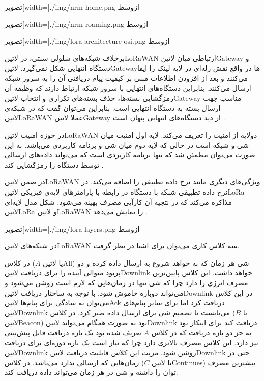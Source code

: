 ‌تصویر[width=\textwidth]{./img/nrm-home.png}
‌ازوسط

‌تصویر[width=\textwidth]{./img/nrm-roaming.png}
‌ازوسط

‌تصویر[width=\textwidth]{./img/lora-architecture-osi.png}
‌ازوسط

برخلاف شبکه‌های سلولی سنتی، در ‌لاتین{LoRaWAN} ارتباطی میان ‌لاتین{Gateway} و دستگاه انتهایی شکل نمی‌گیرد.
‌لاتین{Gateway}ها در واقع نقش رله‌ای در لایه لینک را ایفا می‌کنند و بعد از افزودن اطلاعات مبنی بر کیفیت پیام دریافتی آن
را به سرور شبکه ارسال می‌کنند. بنابراین دستگاه‌های انتهایی با سرور شبکه ارتباط دارند که وظیفه آن رمزگشایی بسته‌ها، حذف بسته‌های تکراری و
انتخاب ‌لاتین{Gateway} مناسب جهت ارسال بسته به دستگاه انتهایی است.
بنابراین می‌توان گفت که در شبکه‌ی ‌لاتین{LoRaWAN} عملا ‌لاتین{Gateway} از دید دستگاه‌های انتهایی پنهان است
.

در حوزه امنیت ‌لاتین{LoRaWAN} دولایه از امنیت را تعریف می‌کند. لایه اول امنیت میان شی و شبکه است در حالی که لایه دوم میان شی و برنامه کاربردی می‌باشد.
به این صورت می‌توان مطمئن شد که تنها برنامه کاربردی است که می‌تواند داده‌های ارسالی توسط دستگاه را رمزگشایی کند
.

در ضمن ‌لاتین{LoRaWAN} ویژگی‌های دیگری مانند نرخ داده تطبیقی را اضافه می‌کند. در نرخ داده تطبیقی شبکه با دستگاه در رابطه با پارامترهای لایه‌ی فیزیکی ‌لاتین{LoRa} مذاکره می‌کند
که در نتجیه آن کارآیی مصرف بهینه می‌شود. شکل  مدل لایه‌ای ‌لاتین{LoRa} و ‌لاتین{LoRaWAN} را نمایش می‌دهد
.

‌تصویر[width=\textwidth]{./img/lora-layers.png}
‌ازوسط

در شبکه‌های ‌لاتین{LoRaWAN} سه کلاس کاری می‌توان برای اشیا در نظر گرفت.

 در کلاس ($A$ یا ‌لاتین{All}) شی هر زمان که به خواهد شروع به ارسال داده کرده و دو پریود متوالی آینده را برای دریافت ‌لاتین{Downlink} خواهد داشت. این کلاس پایین‌ترین مصرف انرژی را دارد چرا که شی تنها در زمان‌هایی که لازم است
روشن می‌شود و می‌تواند دوباره خاموش شود. با توجه به ساختار دریافت ‌لاتین{Downlink} در این کلاس می‌توان به سادگی برای پیام‌ها ‌لاتین{Ack} دریافت کرد اما برای سایر پیام‌های ‌لاتین{Downlink} می‌بایست تا تصمیم شی برای ارسال داده صبر کرد.
 در کلاس ($B$ یا ‌لاتین{Beacon}) نود به صورت همگام می‌تواند ‌لاتین{Downlink} دریافت کند برای اینکار نود به جز دو بازه دریافت که در کلاس $A$ تعریف شده بود یک بازه دریافت قابل پیش‌بینی نیز دارد.
این کلاس مصرف بالاتری دارد چرا که نیاز است یک بازه دوره‌ای برای دریافت ‌لاتین{Downlink} روشن شود. مزیت این کلاس قابلیت دریافت ‌لاتین{Downlink} حتی در زمان‌هایی که ارسالی ندارد می‌باشد.
 در کلاس ($C$ یا ‌لاتین{Continues}) بیشترین مصرف توان را داشته و شی در هر زمان می‌تواند داده دریافت کند.


